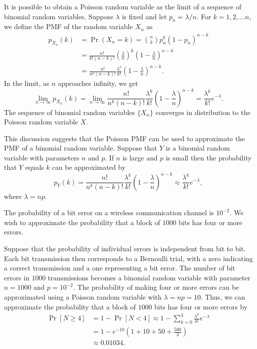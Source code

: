 It is possible to obtain a Poisson random variable as the limit of a sequence of binomial random variables.
Suppose $\lambda$ is fixed and let $p_n = \lambda/n$.
For $k = 1, 2, \ldots n$, we define the PMF of the random variable $X_n$ as
\begin{equation*}
\begin{split}
p_{X_n} (k) &= \Pr (X_n = k)
= \binom{n}{k} p_n^k (1-p_n)^{n-k} \\
&= \frac{n!}{k!(n-k)!} \left( \frac{\lambda}{n} \right)^k
\left( 1 - \frac{\lambda}{n} \right)^{n-k} \\
&= \frac{n!}{n^k (n-k)!} \frac{\lambda^k}{k!}
\left( 1 - \frac{\lambda}{n} \right)^{n-k} .
\end{split}
\end{equation*}
In the limit, as $n$ approaches infinity, we get
\begin{equation*}
\lim_{n \rightarrow \infty} p_{X_n} (k)
= \lim_{n \rightarrow \infty} \frac{n!}{n^k (n-k)!} \frac{\lambda^k}{k!}
\left( 1 - \frac{\lambda}{n} \right)^{n-k}
= \frac{\lambda^k}{k!} e^{- \lambda} .
\end{equation*}
The sequence of binomial random variables $\{ X_n \}$ converges in distribution to the Poisson random variable $X$.

This discussion suggests that the Poisson PMF can be used to approximate the PMF of a binomial random variable.
Suppose that $Y$ is a binomial random variable with parameters $n$ and $p$.
If $n$ is large and $p$ is small then the probability that $Y$ equals $k$ can be approximated by
\begin{equation*}
p_{Y} (k) = \frac{n!}{n^k (n-k)!} \frac{\lambda^k}{k!}
\left( 1 - \frac{\lambda}{n} \right)^{n-k}
\approx \frac{\lambda^k}{k!} e^{- \lambda} ,
\end{equation*}
where $\lambda = n p$.

\begin{example}
The probability of a bit error on a wireless communication channel is $10^{-2}$.
We wish to approximate the probability that a block of $1000$ bits has four or more errors.

Suppose that the probability of individual errors is independent from bit to bit.
Each bit transmission then corresponds to a Bernoulli trial, with a zero indicating a correct transmission and a one representing a bit error.
The number of bit errors in $1000$ transmissions becomes a binomial random variable with parameter $n = 1000$ and $p = 10^{-2}$.
The probability of making four or more errors can be approximated using a Poisson random variable with $\lambda = np = 10$.
Thus, we can approximate the probability that a block of $1000$ bits has four or more errors by
\begin{equation*}
\begin{split}
\Pr [ N \geq 4 ] &= 1 - \Pr [ N < 4 ]
\approx 1 - \sum_{k=0}^3 \frac{\lambda^k}{k!} e^{-\lambda} \\
&= 1 - e^{-10} \left( 1 + 10 + 50 + \frac{500}{3} \right) \\
&\approx 0.01034 .
\end{split}
\end{equation*}
\end{example}



